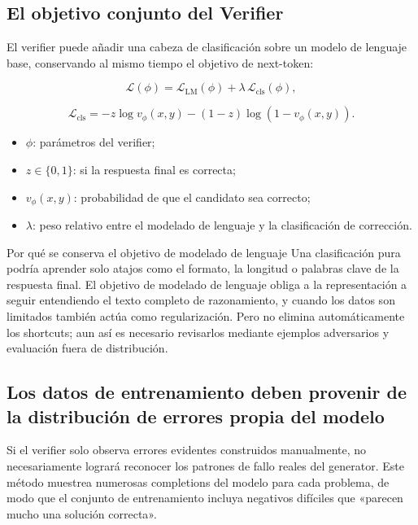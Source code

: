 \documentclass[a4paper]{article}
\begin{document}
\subsection{El objetivo conjunto del Verifier}

El verifier puede añadir una cabeza de clasificación sobre un modelo de lenguaje base, conservando al mismo tiempo el objetivo de next-token:

$$
\mathcal L(\phi)
=\mathcal L_{\mathrm{LM}}(\phi)
+\lambda\,\mathcal L_{\mathrm{cls}}(\phi),
$$

$$
\mathcal L_{\mathrm{cls}}
=-z\log v_{\phi}(x,y)-(1-z)\log(1-v_{\phi}(x,y)).
$$

\begin{itemize}
    \item $\phi$: parámetros del verifier;
    \item $z\in\{0,1\}$: si la respuesta final es correcta;
    \item $v_{\phi}(x,y)$: probabilidad de que el candidato sea correcto;
    \item $\lambda$: peso relativo entre el modelado de lenguaje y la clasificación de corrección.
\end{itemize}


\begin{knowledgebox}{Por qué se conserva el objetivo de modelado de lenguaje}
Una clasificación pura podría aprender solo atajos como el formato, la longitud o palabras clave de la respuesta final. El objetivo de modelado de lenguaje obliga a la representación a seguir entendiendo el texto completo de razonamiento, y cuando los datos son limitados también actúa como regularización. Pero no elimina automáticamente los shortcuts; aun así es necesario revisarlos mediante ejemplos adversarios y evaluación fuera de distribución.
\end{knowledgebox}

\subsection{Los datos de entrenamiento deben provenir de la distribución de errores propia del modelo}

Si el verifier solo observa errores evidentes construidos manualmente, no necesariamente logrará reconocer los patrones de fallo reales del generator. Este método muestrea numerosas completions del modelo para cada problema, de modo que el conjunto de entrenamiento incluya negativos difíciles que «parecen mucho una solución correcta».
\end{document}
